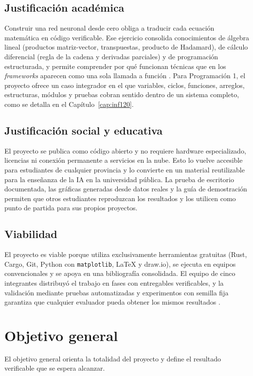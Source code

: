 \subsection{Justificación académica}
Construir una red neuronal desde cero obliga a traducir cada ecuación matemática en código verificable. Ese ejercicio consolida conocimientos de álgebra lineal (productos matriz-vector, transpuestas, producto de Hadamard), de cálculo diferencial (regla de la cadena y derivadas parciales) y de programación estructurada, y permite comprender por qué funcionan técnicas que en los \emph{frameworks} aparecen como una sola llamada a función \citep{nielsen2015,deisenroth2020}. Para Programación 1, el proyecto ofrece un caso integrador en el que variables, ciclos, funciones, arreglos, estructuras, módulos y pruebas cobran sentido dentro de un sistema completo, como se detalla en el Capítulo~\ref{cap:inf120}.

\subsection{Justificación social y educativa}
El proyecto se publica como código abierto y no requiere hardware especializado, licencias ni conexión permanente a servicios en la nube. Esto lo vuelve accesible para estudiantes de cualquier provincia y lo convierte en un material reutilizable para la enseñanza de la IA en la universidad pública. La prueba de escritorio documentada, las gráficas generadas desde datos reales y la guía de demostración permiten que otros estudiantes reproduzcan los resultados y los utilicen como punto de partida para sus propios proyectos.

\subsection{Viabilidad}
El proyecto es viable porque utiliza exclusivamente herramientas gratuitas (Rust, Cargo, Git, Python con \texttt{matplotlib}, \LaTeX{} y draw.io), se ejecuta en equipos convencionales y se apoya en una bibliografía consolidada. El equipo de cinco integrantes distribuyó el trabajo en fases con entregables verificables, y la validación mediante pruebas automatizadas y experimentos con semilla fija garantiza que cualquier evaluador pueda obtener los mismos resultados \citep{hernandez2018}.

\section{Objetivo general}\label{sec:objgeneral}
El objetivo general orienta la totalidad del proyecto y define el resultado verificable que se espera alcanzar.

